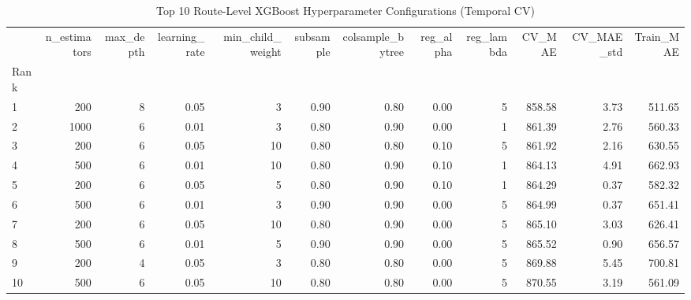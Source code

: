 \begin{table}
\caption{Top 10 Route-Level XGBoost Hyperparameter Configurations (Temporal CV)}
\label{tab:top10_hyperparams}
\begin{tabular}{lrrrrrrrrrrr}
\toprule
 & n_estimators & max_depth & learning_rate & min_child_weight & subsample & colsample_bytree & reg_alpha & reg_lambda & CV_MAE & CV_MAE_std & Train_MAE \\
Rank &  &  &  &  &  &  &  &  &  &  &  \\
\midrule
1 & 200 & 8 & 0.05 & 3 & 0.90 & 0.80 & 0.00 & 5 & 858.58 & 3.73 & 511.65 \\
2 & 1000 & 6 & 0.01 & 3 & 0.80 & 0.90 & 0.00 & 1 & 861.39 & 2.76 & 560.33 \\
3 & 200 & 6 & 0.05 & 10 & 0.80 & 0.80 & 0.10 & 5 & 861.92 & 2.16 & 630.55 \\
4 & 500 & 6 & 0.01 & 10 & 0.80 & 0.90 & 0.10 & 1 & 864.13 & 4.91 & 662.93 \\
5 & 200 & 6 & 0.05 & 5 & 0.80 & 0.90 & 0.10 & 1 & 864.29 & 0.37 & 582.32 \\
6 & 500 & 6 & 0.01 & 3 & 0.90 & 0.90 & 0.00 & 5 & 864.99 & 0.37 & 651.41 \\
7 & 200 & 6 & 0.05 & 10 & 0.80 & 0.90 & 0.00 & 5 & 865.10 & 3.03 & 626.41 \\
8 & 500 & 6 & 0.01 & 5 & 0.90 & 0.90 & 0.00 & 5 & 865.52 & 0.90 & 656.57 \\
9 & 200 & 4 & 0.05 & 3 & 0.80 & 0.80 & 0.00 & 5 & 869.88 & 5.45 & 700.81 \\
10 & 500 & 6 & 0.05 & 10 & 0.80 & 0.80 & 0.00 & 5 & 870.55 & 3.19 & 561.09 \\
\bottomrule
\end{tabular}
\end{table}

